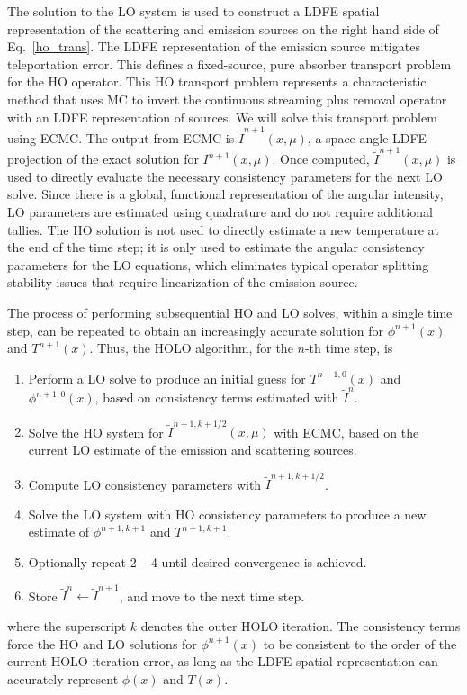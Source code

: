 \documentclass[12pt]{article}
\begin{document}
\begin{center}
The solution to the LO system is used to construct a LDFE spatial representation of
the scattering and emission sources on the right hand side of Eq.~\eqref{ho_trans}.
The LDFE representation of the emission source mitigates teleportation error.
 This defines a fixed-source, pure absorber
transport problem for the HO operator. This HO transport problem represents a characteristic method that uses MC to
invert the continuous streaming plus removal operator with an LDFE representation of
sources. We will solve this transport problem using ECMC.  The output from ECMC is
$\tilde{I}^{n+1}(x,\mu)$, a space-angle LDFE projection of the exact solution for
$I^{n+1}(x,\mu)$.  Once computed, $\tilde{I}^{n+1}(x,\mu)$ is used
to directly evaluate the necessary consistency parameters for the next LO solve.  Since there is a global, functional representation of
the angular intensity,  LO parameters are estimated using quadrature and do not
require additional tallies.  The HO solution is not used to directly estimate a new
temperature at the end of the time step; it is
only used to estimate the angular consistency parameters for the LO equations, which eliminates
typical operator splitting stability issues that require linearization of the emission source.

The process of performing subsequential HO and LO solves, within a single time step, can be repeated to obtain an increasingly accurate solution for $\phi^{n+1}(x)$ and $T^{n+1}(x)$.  Thus, the HOLO algorithm, for the $n$-th time step, is
\begin{enumerate}
\item Perform a LO solve to produce an initial guess for $T^{n+1,0}(x)$
    and $\phi^{n+1,0}(x)$, based on consistency terms estimated with $\tilde{I}^{n}$.
\item Solve the HO system for $\tilde{I}^{n+1,k+1/2}(x,\mu)$ with ECMC, based on the current
    LO estimate of the emission and scattering sources.%
\item Compute LO consistency parameters with $\tilde{I}^{n+1,k+1/2}$.  
\item Solve the LO system with HO consistency parameters to produce a new
    estimate of $\phi^{n+1,k+1}$ and $T^{n+1,k+1}$.
\item Optionally repeat 2 -- 4 until desired convergence is achieved.
\item Store $\tilde{I}^{n}\leftarrow\tilde{I}^{n+1}$, and move to the next time step.
\end{enumerate}
where the superscript $k$ denotes the outer HOLO iteration.
The consistency terms force the HO
and LO solutions for $\phi^{n+1}(x)$ to be consistent to the order of the current HOLO
iteration error, as long as the LDFE spatial representation can accurately represent
$\phi(x)$ and $T(x)$.



\end{center}
\end{document}
